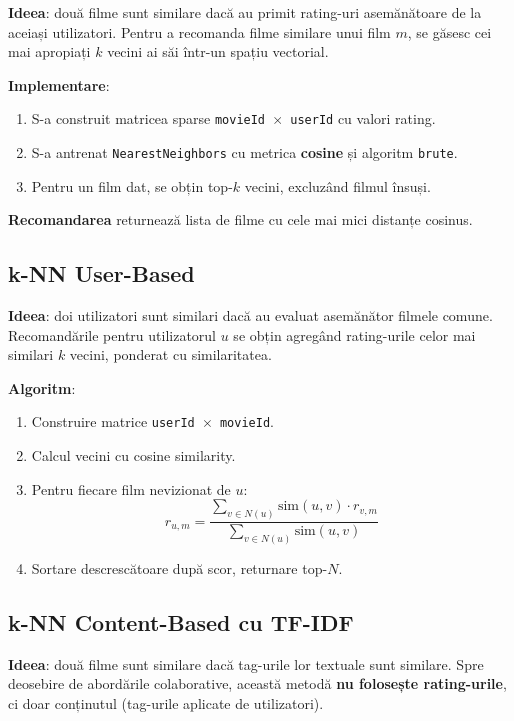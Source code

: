 \documentclass[12pt,a4paper]{article}
\begin{document}
\textbf{Ideea}: două filme sunt similare dacă au primit rating-uri asemănătoare de la aceiași utilizatori. Pentru a recomanda filme similare unui film $m$, se găsesc cei mai apropiați $k$ vecini ai săi într-un spațiu vectorial.

\textbf{Implementare}:
\begin{enumerate}[noitemsep]
    \item S-a construit matricea sparse \texttt{movieId $\times$ userId} cu valori rating.
    \item S-a antrenat \texttt{NearestNeighbors} cu metrica \textbf{cosine} și algoritm \texttt{brute}.
    \item Pentru un film dat, se obțin top-$k$ vecini, excluzând filmul însuși.
\end{enumerate}

\textbf{Recomandarea} returnează lista de filme cu cele mai mici distanțe cosinus.

\subsection{k-NN User-Based}

\textbf{Ideea}: doi utilizatori sunt similari dacă au evaluat asemănător filmele comune. Recomandările pentru utilizatorul $u$ se obțin agregând rating-urile celor mai similari $k$ vecini, ponderat cu similaritatea.

\textbf{Algoritm}:
\begin{enumerate}[noitemsep]
    \item Construire matrice \texttt{userId $\times$ movieId}.
    \item Calcul vecini cu cosine similarity.
    \item Pentru fiecare film nevizionat de $u$:
    $$\hat{r}_{u,m} = \frac{\sum_{v \in N(u)} \text{sim}(u,v) \cdot r_{v,m}}{\sum_{v \in N(u)} \text{sim}(u,v)}$$
    \item Sortare descrescătoare după scor, returnare top-$N$.
\end{enumerate}

\subsection{k-NN Content-Based cu TF-IDF}

\textbf{Ideea}: două filme sunt similare dacă tag-urile lor textuale sunt similare. Spre deosebire de abordările colaborative, această metodă \textbf{nu folosește rating-urile}, ci doar conținutul (tag-urile aplicate de utilizatori).
\end{document}
